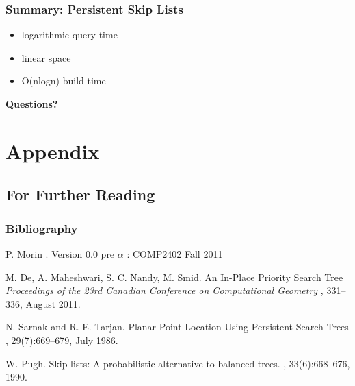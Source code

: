 \documentclass{beamer}
\begin{document}
\begin{frame}
  \frametitle<presentation>{Summary: Persistent Skip Lists}

  \begin{center}
    \begin{itemize}
    \item
      \alert{logarithmic} query time
    \item
      \alert{linear} space
    \item
      \alert{O(nlogn)} build time
    \end{itemize}
  \end{center}

\end{frame}

\begin{frame}
  \begin{center}
    {\bf Questions?}
  \end{center}
\end{frame}

\appendix
\section*{Appendix}

\subsection*{For Further Reading}

\begin{frame}
  \frametitle<presentation>{Bibliography}

  \begin{thebibliography}{10}
    
  \beamertemplatebookbibitems

    P. Morin
    .
    \newblock Version 0.0 pre $\alpha$ : COMP2402 Fall 2011
    
  \beamertemplatearticlebibitems

    M. De, A. Maheshwari, S. C. Nandy, M. Smid.
    \newblock An In-Place Priority Search Tree
    \newblock
    {
      \em Proceedings of the 23rd Canadian Conference on Computational Geometry
    },
    331--336, August 2011.

    N. Sarnak and R. E. Tarjan.
    \newblock Planar Point Location Using Persistent Search Trees
    ,
    29(7):669--679, July 1986.

    W. Pugh.
    \newblock Skip lists: A probabilistic alternative to balanced trees.
    ,
    33(6):668--676, 1990.

  \end{thebibliography}
\end{frame}
\end{document}
